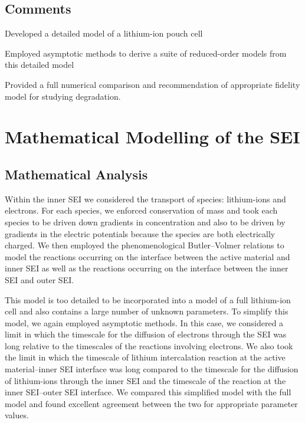 \documentclass[english,a4paper,oneside,9pt]{extarticle}
\begin{document}
\newpage

\subsection{Comments}
\begin{infommitemize}
	\item Developed a detailed model of a lithium-ion pouch cell
	\item Employed asymptotic methods to derive a suite of reduced-order models from this detailed model
	\item Provided a full numerical comparison and recommendation of appropriate fidelity model for studying degradation.
\end{infommitemize}

\section{Mathematical Modelling of the SEI}
\subsection{Mathematical Analysis}
Within the inner SEI we considered the transport of species: lithium-ions and electrons. For each species, we enforced conservation of mass and took each species to be driven down gradients in concentration and also to be driven by gradients in the electric potentials because the species are both electrically charged. We then employed the phenomenological Butler--Volmer relations to model the reactions occurring on the interface between the active material and inner SEI as well as the reactions occurring on the interface between the inner SEI and outer SEI.

This model is too detailed to be incorporated into a model of a full lithium-ion cell and also contains a large number of unknown parameters. To simplify this model, we again employed asymptotic methods. In this case, we considered a limit in which the timescale for the diffusion of electrons through the SEI was long relative to the timescales of the reactions involving electrons. We also took the limit in which the timescale of lithium intercalation reaction at the active material--inner SEI interface was long compared to the timescale for the diffusion of lithium-ions through the inner SEI and the timescale of the reaction at the inner SEI--outer SEI interface. We compared this simplified model with the full model and found excellent agreement between the two for appropriate parameter values.
\end{document}
